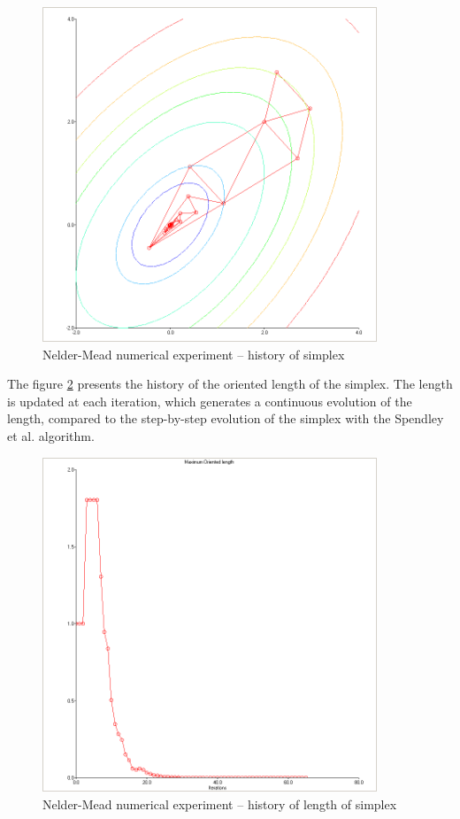\begin{figure}
\begin{center}
\includegraphics[width=10cm]{quad2bis-nm-simplexcontours.png}
\end{center}
\caption{Nelder-Mead numerical experiment -- history of simplex}
\label{fig-nm-numexp1-historysimplex}
\end{figure}

The figure \ref{fig-nm-numexp1-sigma} presents the history of the oriented
length of the simplex. The length is updated at each iteration, which 
generates a continuous evolution of the length, compared to the 
step-by-step evolution of the simplex with the Spendley et al. algorithm.

\begin{figure}
\begin{center}
\includegraphics[width=10cm]{quad2bis-nm-history-sigma.png}
\end{center}
\caption{Nelder-Mead numerical experiment -- history of length of simplex}
\label{fig-nm-numexp1-sigma}
\end{figure}

